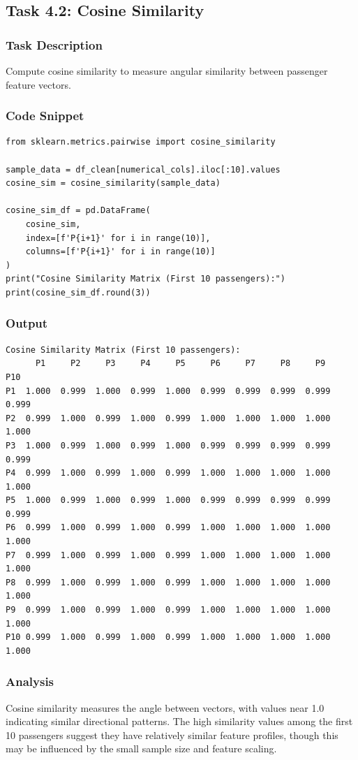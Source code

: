 \documentclass[12pt,a4paper]{article}
\begin{document}
\subsection{Task 4.2: Cosine Similarity}

\subsubsection{Task Description}
Compute cosine similarity to measure angular similarity between passenger feature vectors.

\subsubsection{Code Snippet}
\begin{lstlisting}
from sklearn.metrics.pairwise import cosine_similarity

sample_data = df_clean[numerical_cols].iloc[:10].values
cosine_sim = cosine_similarity(sample_data)

cosine_sim_df = pd.DataFrame(
    cosine_sim, 
    index=[f'P{i+1}' for i in range(10)],
    columns=[f'P{i+1}' for i in range(10)]
)
print("Cosine Similarity Matrix (First 10 passengers):")
print(cosine_sim_df.round(3))
\end{lstlisting}

\subsubsection{Output}
\begin{verbatim}
Cosine Similarity Matrix (First 10 passengers):
      P1     P2     P3     P4     P5     P6     P7     P8     P9    P10
P1  1.000  0.999  1.000  0.999  1.000  0.999  0.999  0.999  0.999  0.999
P2  0.999  1.000  0.999  1.000  0.999  1.000  1.000  1.000  1.000  1.000
P3  1.000  0.999  1.000  0.999  1.000  0.999  0.999  0.999  0.999  0.999
P4  0.999  1.000  0.999  1.000  0.999  1.000  1.000  1.000  1.000  1.000
P5  1.000  0.999  1.000  0.999  1.000  0.999  0.999  0.999  0.999  0.999
P6  0.999  1.000  0.999  1.000  0.999  1.000  1.000  1.000  1.000  1.000
P7  0.999  1.000  0.999  1.000  0.999  1.000  1.000  1.000  1.000  1.000
P8  0.999  1.000  0.999  1.000  0.999  1.000  1.000  1.000  1.000  1.000
P9  0.999  1.000  0.999  1.000  0.999  1.000  1.000  1.000  1.000  1.000
P10 0.999  1.000  0.999  1.000  0.999  1.000  1.000  1.000  1.000  1.000
\end{verbatim}

\subsubsection{Analysis}
Cosine similarity measures the angle between vectors, with values near 1.0 indicating similar directional patterns. The high similarity values among the first 10 passengers suggest they have relatively similar feature profiles, though this may be influenced by the small sample size and feature scaling.
\end{document}
